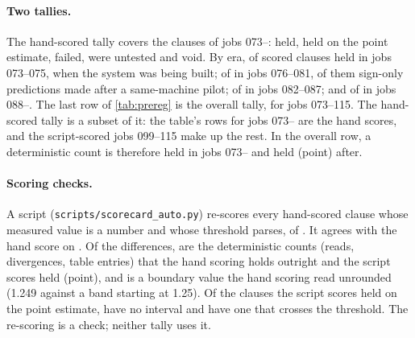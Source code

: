 \paragraph{Two tallies.} The hand-scored tally covers the \scClauses{} clauses of jobs 073--\scLastJob: \scHeld{}
held, \scHeldPoint{} held on the point estimate, \scFailed{} failed, \scUntested{} were untested and \scVoid{} void.
By era, \scEarlyHeld{} of \scEarlyScored{} scored clauses held in jobs 073--075, when the system was being built;
\scMidHeld{} of \scMidScored{} in jobs 076--081, \scMidSign{} of them sign-only predictions made after a same-machine
pilot; \scLateHeld{} of \scLateScored{} in jobs 082--087; and \scRevHeld{} of \scRevScored{} in jobs 088--\scLastJob.
The last row of \cref{tab:prereg} is the overall tally, for jobs 073--115. The hand-scored tally is a subset of it:
the table's rows for jobs 073--\scLastJob{} are the hand scores, and the script-scored jobs 099--115 make up the rest.
In the overall row, a deterministic count is therefore held in jobs 073--\scLastJob{} and held (point) after.

\paragraph{Scoring checks.} A script (\texttt{scripts/scorecard\_auto.py}) re-scores every hand-scored clause whose
measured value is a number and whose threshold parses, \scaAuto{} of \scaN. It agrees with the hand score on
\scaAgree. Of the \scaDisagree{} differences, \scaDet{} are the deterministic counts (reads, divergences, table
entries) that the hand scoring holds outright and the script scores held (point), and \scaOther{} is a boundary value
the hand scoring read unrounded (1.249 against a band starting at 1.25). Of the clauses the script scores held on the
point estimate, \scaNoInterval{} have no interval and \scaCrosses{} have one that crosses the threshold. The
re-scoring is a check; neither tally uses it.


